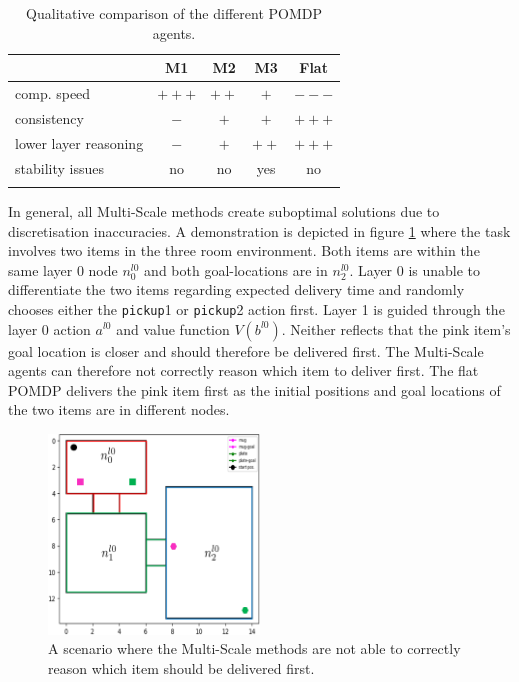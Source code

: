 \begin{table}[h!]
    \centering
    \begin{tabular}{l c c c c}
    \toprule
         &  M1 & M2 & M3 & Flat\\
    \midrule
        \addlinespace
         comp. speed & $+++$ & $++$ & $+$ & $---$ \\
         \addlinespace
         consistency & $-$ & $+$ & $+$ & $+++$ \\
         \addlinespace
         lower layer reasoning & $-$ & $+$ & $++$ & $+++$ \\
         \addlinespace
         stability issues & no & no& yes & no\\
         \addlinespace
    \bottomrule
    \end{tabular}
    \caption{Qualitative comparison of the different POMDP agents.}
    \label{tab:properties}
\end{table}
In general, all Multi-Scale methods create suboptimal solutions due to discretisation inaccuracies. A demonstration is depicted in figure \ref{fig:suboptimal} where the task involves two items in the three room environment. Both items are within the same layer 0 node $n_0^{l0}$ and both goal-locations are in $n_2^{l0}$. Layer 0 is unable to differentiate the two items regarding expected delivery time and randomly chooses either the \texttt{pickup}1 or \texttt{pickup}2 action first. Layer 1 is guided through the layer 0 action $a^{l0}$ and value function $V(b^{l0})$. Neither reflects that the pink item's goal location is closer and should therefore be delivered first. The Multi-Scale agents can therefore not correctly reason which item to deliver first. The flat POMDP delivers the pink item first as the initial positions and goal locations of the two items are in different nodes. 
\begin{figure}
    \centering
    \includegraphics[width=0.5\textwidth]{Report/images/suboptimal.png}
    \caption{A scenario where the Multi-Scale methods are not able to correctly reason which item should be delivered first.}
    \label{fig:suboptimal}
\end{figure}
